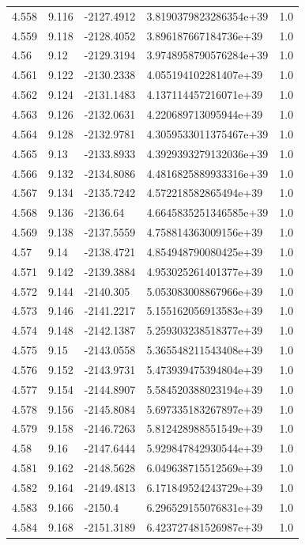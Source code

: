 \begin{tabular}{lllll}
4.558 & 9.116 & -2127.4912 & 3.8190379823286354e+39 & 1.0 \\
4.559 & 9.118 & -2128.4052 & 3.896187667184736e+39 & 1.0 \\
4.56 & 9.12 & -2129.3194 & 3.9748958790576284e+39 & 1.0 \\
4.561 & 9.122 & -2130.2338 & 4.055194102281407e+39 & 1.0 \\
4.562 & 9.124 & -2131.1483 & 4.137114457216071e+39 & 1.0 \\
4.563 & 9.126 & -2132.0631 & 4.220689713095944e+39 & 1.0 \\
4.564 & 9.128 & -2132.9781 & 4.3059533011375467e+39 & 1.0 \\
4.565 & 9.13 & -2133.8933 & 4.3929393279132036e+39 & 1.0 \\
4.566 & 9.132 & -2134.8086 & 4.4816825889933316e+39 & 1.0 \\
4.567 & 9.134 & -2135.7242 & 4.572218582865494e+39 & 1.0 \\
4.568 & 9.136 & -2136.64 & 4.6645835251346585e+39 & 1.0 \\
4.569 & 9.138 & -2137.5559 & 4.758814363009156e+39 & 1.0 \\
4.57 & 9.14 & -2138.4721 & 4.854948790080425e+39 & 1.0 \\
4.571 & 9.142 & -2139.3884 & 4.953025261401377e+39 & 1.0 \\
4.572 & 9.144 & -2140.305 & 5.053083008867966e+39 & 1.0 \\
4.573 & 9.146 & -2141.2217 & 5.155162056913583e+39 & 1.0 \\
4.574 & 9.148 & -2142.1387 & 5.259303238518377e+39 & 1.0 \\
4.575 & 9.15 & -2143.0558 & 5.365548211543408e+39 & 1.0 \\
4.576 & 9.152 & -2143.9731 & 5.473939475394804e+39 & 1.0 \\
4.577 & 9.154 & -2144.8907 & 5.584520388023194e+39 & 1.0 \\
4.578 & 9.156 & -2145.8084 & 5.697335183267897e+39 & 1.0 \\
4.579 & 9.158 & -2146.7263 & 5.812428988551549e+39 & 1.0 \\
4.58 & 9.16 & -2147.6444 & 5.929847842930544e+39 & 1.0 \\
4.581 & 9.162 & -2148.5628 & 6.049638715512569e+39 & 1.0 \\
4.582 & 9.164 & -2149.4813 & 6.171849524243729e+39 & 1.0 \\
4.583 & 9.166 & -2150.4 & 6.296529155076831e+39 & 1.0 \\
4.584 & 9.168 & -2151.3189 & 6.423727481526987e+39 & 1.0 \\

\end{tabular}
